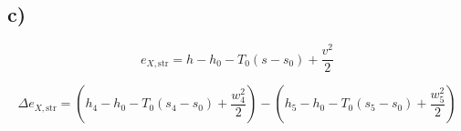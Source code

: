 

\subsection*{c)}

\[
e_{X, \text{str}} = h - h_0 - T_0 (s - s_0) + \frac{v^2}{2}
\]

\[
\Delta e_{X, \text{str}} = \left( h_4 - h_0 - T_0 (s_4 - s_0) + \frac{w_4^2}{2} \right) - \left( h_5 - h_0 - T_0 (s_5 - s_0) + \frac{w_5^2}{2} \right)
\]